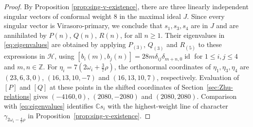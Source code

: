 \documentclass[11pt]{amsart}
\numberwithin{equation}{section}
\theoremstyle{definition}
\theoremstyle{remark}
\newcommand{\ZZ}{\mathbb Z}
\newcommand{\g}{\mathfrak g}
\newcommand{\id}{\operatorname{id}}
\begin{document}
\begin{proof}
	By Proposition \ref{prop:sing-v-existence}, there are three linearly independent singular vectors of conformal weight 8 in the maximal ideal $J$. Since every singular vector is
	Virasoro-primary, we conclude that $s_1,s_3,s_4$ are in $J$ and are annihilated by $P(n)$, $Q(n)$, $R(n)$, for all $n \geq 1$. Their eigenvalues in \eqref{eq:eigenvalues} are obtained by applying
	$P_{(3)}$, $Q_{(3)}$ and $R_{(5)}$ to these expressions in $\mathcal H$,
	using $[b_i(m),b_j(n)]=28m\delta_{ij}\delta_{m+n,0}\id$
	for $1\leq i,j\leq4$ and $m,n\in\ZZ$.
For $\eta_i=7(2\omega_i+\tfrac37\rho)$, the orthonormal coordinates of
$\eta_1,\eta_3,\eta_4$ are $(23,6,3,0)$, $(16,13,10,-7)$ and
$(16,13,10,7)$, respectively. Evaluation of $[P]$ and $[Q]$ at
these points in the shifted coordinates of Section~\ref{sec:Zhu-relations}
gives $(-4160,0)$, $(2080,-2080)$ and $(2080,2080)$.
Comparison with \eqref{eq:eigenvalues} identifies
$\mathbb C s_i$ with the highest-weight line of character
$\gamma_{2\omega_i-\frac47\rho}$ in Proposition~\ref{prop:sing-v-existence}.

\end{proof}
\end{document}
